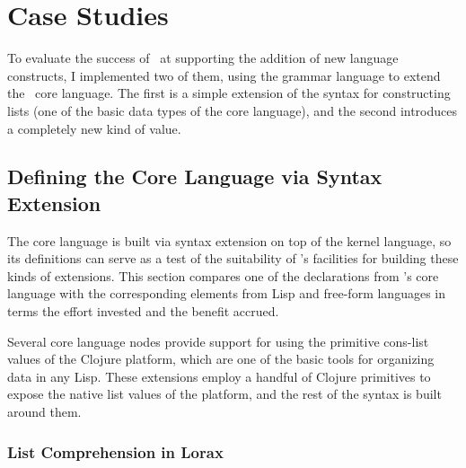 \section{Case Studies}
\label{studies}

To evaluate the success of \Meta\ at supporting the addition of new language constructs, I implemented two of them, using the grammar language to extend the \Meta\ core language. The first is a simple extension of the syntax for constructing lists (one of the basic data types of the core language), and the second introduces a completely new kind of value.

%
%
\subsection{Defining the Core Language via Syntax Extension}
\label{for}
The core language is built via syntax extension on top of the kernel language, so its definitions can serve as a test of the suitability of \Meta's  facilities for building these kinds of extensions. This section compares one of the declarations from \Meta's core language with the corresponding elements from Lisp and free-form languages in terms the effort invested and the benefit accrued.

Several core language nodes provide support for using the primitive cons-list values of the Clojure platform, which are one of the basic tools for organizing data in any Lisp. These extensions employ a handful of Clojure primitives to expose the native list values of the platform, and the rest of the syntax is built around them.


\subsubsection{List Comprehension in Lorax}

